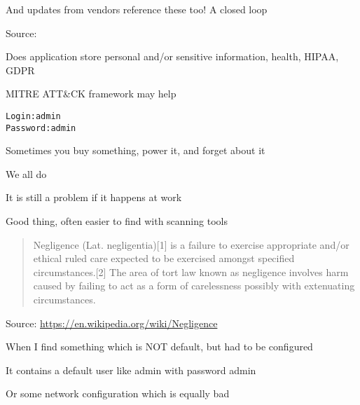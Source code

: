 \documentclass[Screen16to9,17pt]{foils}
\begin{document}
\centerline{And updates from vendors reference these too! A closed loop}





Source:




\begin{list2}
\item Does application store personal and/or sensitive information, health, HIPAA, GDPR
\item MITRE ATT\&CK framework may help 
\end{list2}




\begin{alltt}
Login: admin
Password: admin
\end{alltt}

\begin{list2}
\item Sometimes you buy something, power it, and forget about it
\item We all do
\item It is still a problem if it happens at work
\item Good thing, often easier to find with scanning tools
\end{list2}




\begin{quote}
Negligence (Lat. negligentia)[1] is a failure to exercise appropriate and/or ethical ruled care expected to be exercised amongst specified circumstances.[2] The area of tort law known as negligence involves harm caused by failing to act as a form of carelessness possibly with extenuating circumstances.
\end{quote}
Source: \url{https://en.wikipedia.org/wiki/Negligence}


\begin{list2}
\item When I find something which is NOT default, but had to be configured
\item It contains a default user like admin with password admin
\item Or some network configuration which is equally bad
\end{list2}
\end{document}
